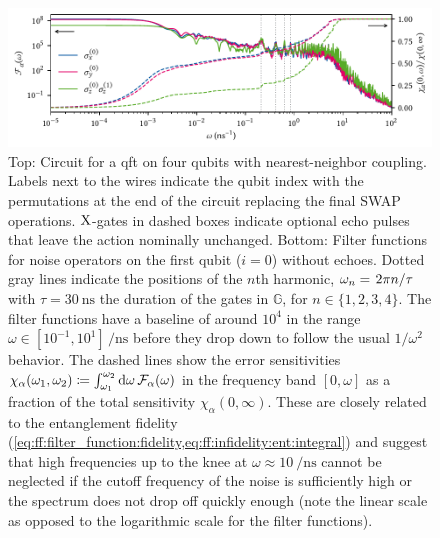 \begin{figure}
    \centering
    
    \bigskip
    \includegraphics{img/pdf/filter_functions/qft_filter_function}
    \caption[
        \protect\newline
    ]{
        Top: Circuit for a \gls{qft} on four qubits with nearest-neighbor coupling.
        Labels next to the wires indicate the qubit index with the permutations at the end of the circuit replacing the final SWAP operations.
        $\mathrm{X}$-gates in dashed boxes indicate optional echo pulses that leave the action nominally unchanged.
        Bottom: Filter functions for noise operators on the first qubit ($i = 0$) without echoes.
        Dotted gray lines indicate the positions of the $n$th harmonic, $\omega_n = \flatfrac{2\pi n}{\tau}$ with $\tau = \qty{30}{\nano\second}$ the duration of the gates in $\mathbb{G}$, for $n\in\lbrace 1, 2, 3, 4\rbrace$.
        The filter functions have a baseline of around $10^4$ in the range $\omega\in[10^{-1}, 10^{1}]\,\unit{\per\nano\second}$ before they drop down to follow the usual $1/\omega^2$ behavior.
        The dashed lines show the error sensitivities $\chi_\alpha(\omega_1,\omega_2)\coloneqq\int_{\omega_1}^{\omega_2}\dd{\omega} \mathcal{F}_\alpha(\omega)$ in the frequency band $[0, \omega]$ as a fraction of the total sensitivity $\chi_\alpha(0,\infty)$.
        These are closely related to the entanglement fidelity (\cf \cref{eq:ff:filter_function:fidelity,eq:ff:infidelity:ent:integral}) and suggest that high frequencies up to the knee at $\omega\approx\qty{10}{\per\nano\second}$ cannot be neglected if the cutoff frequency of the noise is sufficiently high or the spectrum does not drop off quickly enough (note the linear scale as opposed to the logarithmic scale for the filter functions).
    }
    \label{fig:ff:qft}
\end{figure}

